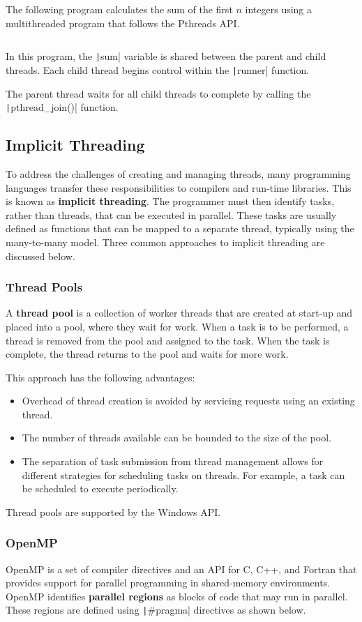 \documentclass{article}
\begin{document}
The following program calculates the sum of the first \(n\) integers
using a multithreaded program that follows the Pthreads API.\@
\inputminted{c}{code/pthreads_multithreading.c} In this program, the
\texttt|sum| variable is shared between the parent and child
threads. Each child thread begins control within the
\texttt|runner| function.

The parent thread waits for all child threads to complete by calling
the \texttt|pthread_join()| function.
\subsection{Implicit Threading}
To address the challenges of creating and managing threads, many
programming languages transfer these responsibilities to compilers and
run-time libraries. This is known as \textbf{implicit threading}. The
programmer must then identify tasks, rather than threads, that can be
executed in parallel. These tasks are usually defined as functions that
can be mapped to a separate thread, typically using the many-to-many
model. Three common approaches to implicit threading are discussed
below.
\subsubsection{Thread Pools}
A \textbf{thread pool} is a collection of worker threads that are
created at start-up and placed into a pool, where they wait for work.
When a task is to be performed, a thread is removed from the pool and
assigned to the task. When the task is complete, the thread returns to
the pool and waits for more work.

This approach has the following advantages:
\begin{itemize}
    \item Overhead of thread creation is avoided by servicing requests
          using an existing thread.
    \item The number of threads available can be bounded to the size of
          the pool.
    \item The separation of task submission from thread management
          allows for different strategies for scheduling tasks on
          threads. For example, a task can be scheduled to execute
          periodically.
\end{itemize}
Thread pools are supported by the Windows API.\@
\subsubsection{OpenMP}
OpenMP is a set of compiler directives and an API for C, C++, and
Fortran that provides support for parallel programming in shared-memory
environments. OpenMP identifies \textbf{parallel regions} as blocks of
code that may run in parallel. These regions are defined using
\texttt|#pragma| directives as shown below.
\end{document}
